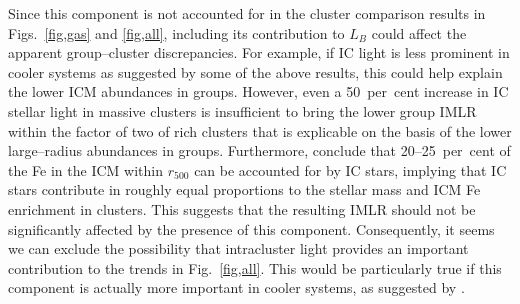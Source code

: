 \documentclass[useAMS,usenatbib]{mn2e}
\begin{document}
Since this component is not accounted for in the cluster comparison
results in Figs.~\ref{fig,gas} and \ref{fig,all}, including its
contribution to $L_B$ could affect the apparent group--cluster
discrepancies. For example, if IC light is less prominent in cooler
systems as suggested by some of the above results, this could help
explain the lower ICM abundances in groups. However, even a
50~per~cent increase in IC stellar light in massive clusters is
insufficient to bring the lower group IMLR within the factor of two of
rich clusters that is explicable on the basis of the lower
large--radius abundances in groups. Furthermore, \citet{siva09}
conclude that 20--25~per~cent of the Fe in the ICM within $r_{500}$
can be accounted for by IC stars, implying that IC stars contribute in
roughly equal proportions to the stellar mass and ICM Fe enrichment in
clusters. This suggests that the resulting IMLR should not be
significantly affected by the presence of this
component. Consequently, it seems we can exclude the possibility that
intracluster light provides an important contribution to the trends in
Fig.~\ref{fig,all}. This would be particularly true if this component
is actually more important in cooler systems, as suggested by
\citet{gonz07}.
\end{document}
